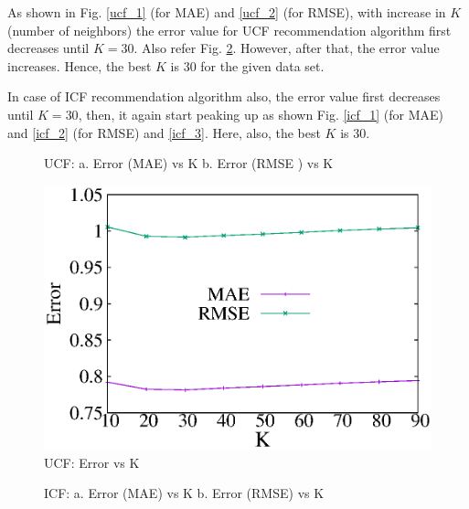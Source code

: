 \documentclass[journal,onecolumn]{IEEEtran}
\begin{document}
As shown in Fig. \ref{ucf_1} (for MAE) and \ref{ucf_2} (for RMSE), with increase in $K$ (number of neighbors) the error value for UCF recommendation algorithm first decreases until $K=30$. Also refer Fig. \ref{ucf_3}. However, after that, the error value increases. Hence, the best $K$ is $30$ for the given data set. 

In case of ICF recommendation algorithm also, the error value first  decreases until $K=30$, then, it again start peaking up as shown Fig. \ref{icf_1} (for MAE) and \ref{icf_2} (for RMSE) and \ref{icf_3}. Here, also, the best $K$ is $30$. 

\begin{figure}[H]
\begin{center}
\label{thr}

\caption{UCF: a. Error (MAE) vs K b. Error (RMSE ) vs K }
\end{center}
\end{figure}


\begin{figure}[H]
\begin{center}
 \includegraphics[scale = 0.98] {images/ucfBestK.eps}
 \caption { UCF: Error vs K} \label{ucf_3}
 \end{center}
\end{figure}



\begin{figure}[h]
\begin{center}
\label{thr}
\caption{ICF: a. Error (MAE) vs K b. Error (RMSE) vs K  }
\end{center}
\end{figure}
\end{document}

